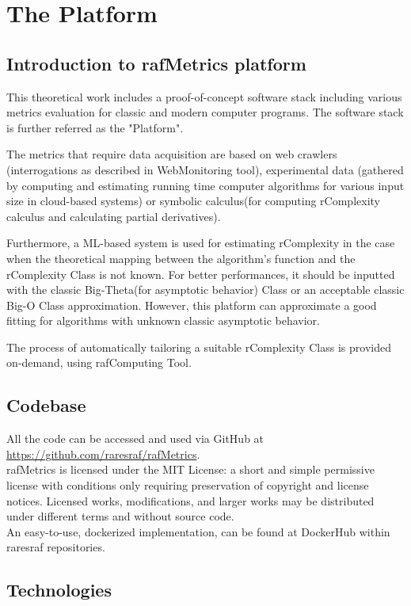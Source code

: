 \chapter{The Platform}


\section{Introduction to rafMetrics platform}
This theoretical work includes a proof-of-concept software stack including various metrics evaluation for classic and modern computer programs. The software stack is further referred as the "Platform".

The metrics that require data acquisition are based on web crawlers (interrogations as described in WebMonitoring tool), experimental data (gathered by computing and estimating running time computer algorithms for various input size in cloud-based systems) or symbolic calculus(for computing rComplexity calculus and calculating partial derivatives).

Furthermore, a ML-based system is used for estimating rComplexity in the case when the theoretical mapping between the algorithm's function and the rComplexity Class is not known. For better performances, it should be inputted with the classic Big-Theta(for asymptotic behavior) Class or an acceptable classic Big-O Class approximation. However, this platform can approximate a good fitting for algorithms with unknown classic asymptotic behavior. 

The process of automatically tailoring a suitable rComplexity Class is provided on-demand, using rafComputing Tool.




\section{Codebase}
All the code can be accessed and used via GitHub at \href{https://github.com/raresraf/rafMetrics}{https://github.com/raresraf/rafMetrics}.
\\
rafMetrics is licensed under the MIT License: a short and simple permissive license with conditions only requiring preservation of copyright and license notices. Licensed works, modifications, and larger works may be distributed under different terms and without source code.
\\
An easy-to-use, dockerized implementation, can be found at DockerHub within raresraf repositories.


\section{Technologies}

